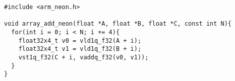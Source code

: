 \begin{lstlisting}[frame=single]
#include <arm_neon.h>

void array_add_neon(float *A, float *B, float *C, const int N){
  for(int i = 0; i < N; i += 4){
    float32x4_t v0 = vld1q_f32(A + i);
    float32x4_t v1 = vld1q_f32(B + i);
    vst1q_f32(C + i, vaddq_f32(v0, v1));
  }
}
\end{lstlisting}